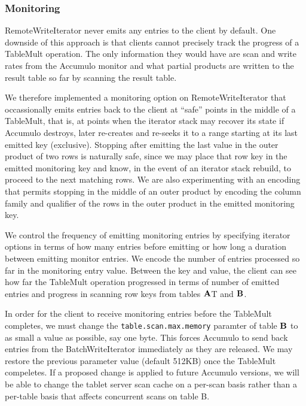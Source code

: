 \subsubsection{Monitoring}
RemoteWriteIterator never emits any entries to the client by default. 
One downside of this approach is that clients cannot precisely track the progress of a TableMult operation.
The only information they would have are scan and write rates from the Accumulo monitor and what partial products 
are written to the result table so far by scanning the result table.

We therefore implemented a monitoring option on RemoteWriteIterator that occassionally emits entries
back to the client at ``safe'' points in the middle of a TableMult, that is,
at points when the iterator stack may recover its state if Accumulo destroys, later re-creates and re-seeks it
to a range starting at its last emitted key (exclusive).
Stopping after emitting the last value in the outer product of two rows is naturally safe, since we may place that row key
in the emitted monitoring key and know, in the event of an iterator stack rebuild, to proceed to the next matching rows.
We are also experimenting with an encoding that permits stopping in the middle of an outer product by encoding the 
column family and qualifier of the rows in the outer product in the emitted monitoring key.

We control the frequency of emitting monitoring entries by specifying iterator options in terms of how many entries
before emitting or how long a duration between emitting monitor entries. We encode the number of entries processed so far 
in the monitoring entry value. Between the key and value, the client can see how far the TableMult operation progressed
in terms of number of emitted entries and progress in scanning row keys from tables $\mathbf{A}$T and $\mathbf{B}$.

In order for the client to receive monitoring entries before the TableMult completes,
we must change the \texttt{table.scan.max.memory} paramter of table $\mathbf{B}$ to as small a value as possible, say one byte. 
This forces Accumulo to send back entries from the BatchWriteIterator immediately as they are released.
We may restore the previous parameter value (default 512KB) once the TableMult compeletes.
If a proposed change \cite{ACCUMULO-261} is applied to future Accumulo versions,
we will be able to change the tablet server scan cache on a per-scan basis rather than a per-table basis
that affects concurrent scans on table B.



